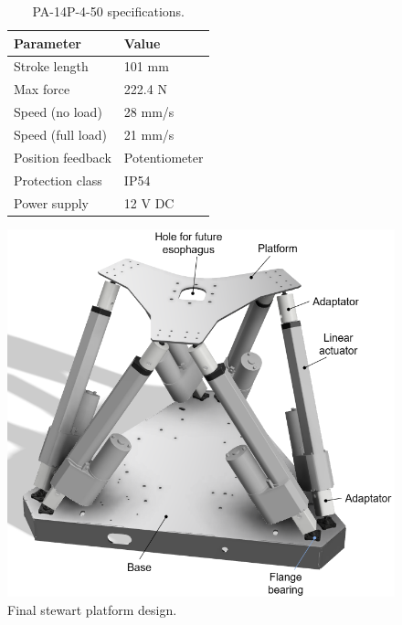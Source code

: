 \begin{figure}[H]
\centering
\begin{minipage}{.4\textwidth}
  \begin{table}[H]
    \centering
    \begin{tabular}{@{}p{3cm} p{2.5cm}@{}}
    \toprule
    \textbf{Parameter} & \textbf{Value}\\
    \midrule
    Stroke length & 101 mm \\
    Max force & 222.4 N \\
    Speed (no load) & 28 mm/s \\
    Speed (full load) & 21 mm/s \\
    Position feedback & Potentiometer \\
    Protection class & IP54 \\
    Power supply & 12 V DC \\
    \bottomrule
    \end{tabular}
    \caption{PA-14P-4-50 specifications.}
    \label{tab:actuator_spec}
  \end{table}
\end{minipage}
\begin{minipage}{.5\textwidth}
  \centering
  \includegraphics[width=\textwidth]{figures/stewart_platform_annotated.drawio.png}
  \caption{Final stewart platform design.}
  \label{fig:stewart_platform}
\end{minipage}
\end{figure}

